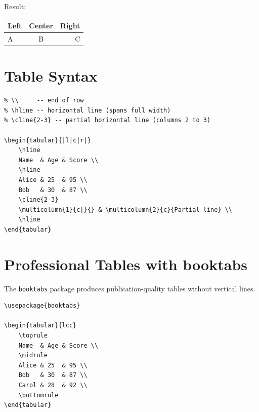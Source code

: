 Result:
\begin{tabular}{|l|c|r|}
    \hline
    Left & Center & Right \\
    \hline
    A    & B      & C \\
    \hline
\end{tabular}

\section{Table Syntax}

\begin{lstlisting}[language={[LaTeX]TeX}, caption=Table syntax reference]
% &      -- column separator
% \\     -- end of row
% \hline -- horizontal line (spans full width)
% \cline{2-3} -- partial horizontal line (columns 2 to 3)

\begin{tabular}{|l|c|r|}
    \hline
    Name  & Age & Score \\
    \hline
    Alice & 25  & 95 \\
    Bob   & 30  & 87 \\
    \cline{2-3}
    \multicolumn{1}{c|}{} & \multicolumn{2}{c}{Partial line} \\
    \hline
\end{tabular}
\end{lstlisting}

\section{Professional Tables with booktabs}

The \texttt{booktabs} package produces publication-quality tables without vertical lines.

\begin{lstlisting}[language={[LaTeX]TeX}, caption=booktabs example]
\usepackage{booktabs}

\begin{tabular}{lcc}
    \toprule
    Name  & Age & Score \\
    \midrule
    Alice & 25  & 95 \\
    Bob   & 30  & 87 \\
    Carol & 28  & 92 \\
    \bottomrule
\end{tabular}
\end{lstlisting}

